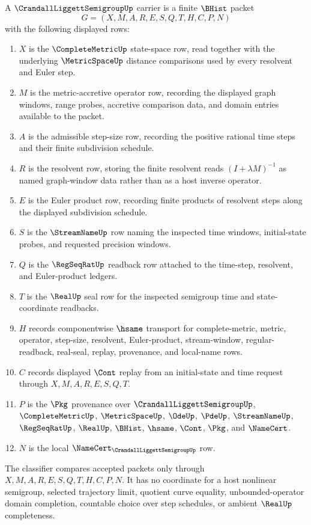 \begin{definition}
\label{def:crandall-liggett-semigroup-carrier}
A $\CrandallLiggettSemigroupUp$ carrier is a finite $\BHist$ packet
$$
G=(X,M,A,R,E,S,Q,T,H,C,P,N)
$$
with the following displayed rows:
\begin{enumerate}
\item $X$ is the $\CompleteMetricUp$ state-space row, read together with the underlying $\MetricSpaceUp$ distance comparisons used by every resolvent and Euler step.
\item $M$ is the metric-accretive operator row, recording the displayed graph windows, range probes, accretive comparison data, and domain entries available to the packet.
\item $A$ is the admissible step-size row, recording the positive rational time steps and their finite subdivision schedule.
\item $R$ is the resolvent row, storing the finite resolvent reads $(I+\lambda M)^{-1}$ as named graph-window data rather than as a host inverse operator.
\item $E$ is the Euler product row, recording finite products of resolvent steps along the displayed subdivision schedule.
\item $S$ is the $\StreamNameUp$ row naming the inspected time windows, initial-state probes, and requested precision windows.
\item $Q$ is the $\RegSeqRatUp$ readback row attached to the time-step, resolvent, and Euler-product ledgers.
\item $T$ is the $\RealUp$ seal row for the inspected semigroup time and state-coordinate readbacks.
\item $H$ records componentwise $\hsame$ transport for complete-metric, metric, operator, step-size, resolvent, Euler-product, stream-window, regular-readback, real-seal, replay, provenance, and local-name rows.
\item $C$ records displayed $\Cont$ replay from an initial-state and time request through $X,M,A,R,E,S,Q,T$.
\item $P$ is the $\Pkg$ provenance over $\CrandallLiggettSemigroupUp$, $\CompleteMetricUp$, $\MetricSpaceUp$, $\OdeUp$, $\PdeUp$, $\StreamNameUp$, $\RegSeqRatUp$, $\RealUp$, $\BHist$, $\hsame$, $\Cont$, $\Pkg$, and $\NameCert$.
\item $N$ is the local $\NameCert_{\CrandallLiggettSemigroupUp}$ row.
\end{enumerate}
The classifier compares accepted packets only through $X,M,A,R,E,S,Q,T,H,C,P,N$. It has no coordinate for a host nonlinear semigroup, selected trajectory limit, quotient curve equality, unbounded-operator domain completion, countable choice over step schedules, or ambient $\RealUp$ completeness.
\end{definition}

